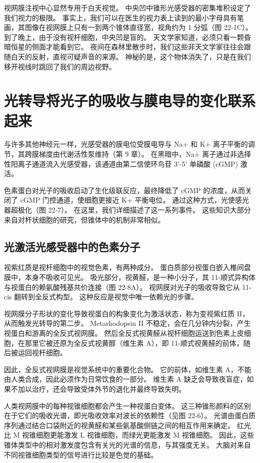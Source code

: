 视网膜注视中心显然专用于白天视觉。 中央凹中锥形光感受器的密集堆积设定了我们视力的极限。 事实上，我们可以在医生的视力表上读到的最小字母具有笔画，其图像在视网膜上只有一到两个锥体直径宽，视角约为 1 分弧（图 22-1C）。 到了晚上，由于没有视杆细胞，中央凹是盲的。 天文学家知道，必须只看一颗昏暗恒星的侧面才能看到它。 夜间在森林里散步时，我们这些非天文学家往往会跟随白天的反射，直视可疑声音的来源。 神秘的是，这个物体消失了，只是在我们移开视线时跳回了我们的周边视野。

\section{光转导将光子的吸收与膜电导的变化联系起来}
与许多其他神经元一样，光感受器的膜电位受膜电导与 Na+ 和 K+ 离子平衡的调节，其跨膜梯度由代谢活性泵维持（第 9 章）。 在黑暗中，Na+ 离子通过非选择性阳离子通道流入光感受器，该通道由第二信使环鸟苷 3'-5' 单磷酸 (cGMP) 激活。

色素蛋白对光子的吸收启动了生化级联反应，最终降低了 cGMP 的浓度，从而关闭了 cGMP 门控通道，使细胞更接近 K+ 平衡电位。 通过这种方式，光使感光器超极化（图 22-7）。 在这里，我们详细描述了这一系列事件。 这些知识大部分来自对杆状细胞的研究，但锥体中的机制非常相似。

\subsection{光激活光感受器中的色素分子}
视紫红质是视杆细胞中的视觉色素，有两种成分。 蛋白质部分视蛋白嵌入椎间盘膜中，本身不吸收可见光。 吸光部分，视黄醛，是一种小分子，其 11-顺式异构体与视蛋白的赖氨酸残基共价连接（图 22-8A）。 视网膜对光子的吸收导致它从 11-cis 翻转到全反式构型。 这种反应是视觉中唯一依赖光的步骤。

视网膜分子形状的变化导致视蛋白的构象变化为激活状态，称为变视紫红质 II，从而触发光转导的第二步。 Metarhodopsin II 不稳定，会在几分钟内分裂，产生视蛋白和游离的全反式视网膜。 然后全反式视黄醛从视杆细胞运送到色素上皮细胞，在那里它被还原为全反式视黄醇（维生素 A），即 11-顺式视黄醛的前体，随后被运回视杆细胞。

因此，全反式视网膜是视觉系统中的重要化合物。 它的前体，如维生素 A，不能由人类合成，因此必须作为日常饮食的一部分。 维生素 A 缺乏会导致夜盲症，如果不加以治疗，还会导致受体外节的退化并最终导致失明。

人类视网膜中的每种视锥细胞都会产生一种视蛋白变体。 这三种锥形颜料的区别在于它们的吸收光谱，即光吸收效率对波长的依赖性（见图 22-6）。 光谱由蛋白质序列通过结合口袋附近的视黄醛和某些氨基酸侧链之间的相互作用来确定。 红光比 M 视锥细胞更能激发 L 视锥细胞，而绿光更能激发 M 视锥细胞。 因此，这些锥体类型中的相对激发度包含有关光的光谱的信息，与其强度无关。 大脑对来自不同视锥细胞类型的信号进行比较是色觉的基础。

